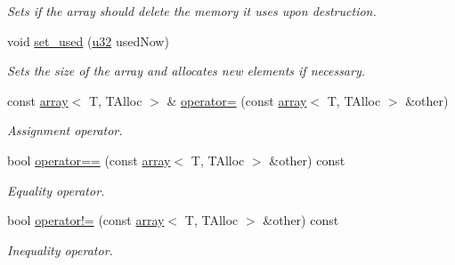 \begin{DoxyCompactItemize}
\begin{DoxyCompactList}\small\item\em Sets if the array should delete the memory it uses upon destruction. \end{DoxyCompactList}\item 
void \hyperlink{classirr_1_1core_1_1array_a64d70ab89f03e2ec4deae3b6c0161305}{set\+\_\+used} (\hyperlink{namespaceirr_a0416a53257075833e7002efd0a18e804}{u32} used\+Now)
\begin{DoxyCompactList}\small\item\em Sets the size of the array and allocates new elements if necessary. \end{DoxyCompactList}\item 
\mbox{\label{classirr_1_1core_1_1array_a51c964d180507ebdef872d93886c23b2}} 
const \hyperlink{classirr_1_1core_1_1array}{array}$<$ T, T\+Alloc $>$ \& \hyperlink{classirr_1_1core_1_1array_a51c964d180507ebdef872d93886c23b2}{operator=} (const \hyperlink{classirr_1_1core_1_1array}{array}$<$ T, T\+Alloc $>$ \&other)
\begin{DoxyCompactList}\small\item\em Assignment operator. \end{DoxyCompactList}\item 
\mbox{\label{classirr_1_1core_1_1array_a794059b2ff063c9604eb46ae4edb599c}} 
bool \hyperlink{classirr_1_1core_1_1array_a794059b2ff063c9604eb46ae4edb599c}{operator==} (const \hyperlink{classirr_1_1core_1_1array}{array}$<$ T, T\+Alloc $>$ \&other) const
\begin{DoxyCompactList}\small\item\em Equality operator. \end{DoxyCompactList}\item 
\mbox{\label{classirr_1_1core_1_1array_a7177f0d74f839a3f26df8eedcdfc4391}} 
bool \hyperlink{classirr_1_1core_1_1array_a7177f0d74f839a3f26df8eedcdfc4391}{operator!=} (const \hyperlink{classirr_1_1core_1_1array}{array}$<$ T, T\+Alloc $>$ \&other) const
\begin{DoxyCompactList}\small\item\em Inequality operator. \end{DoxyCompactList}\item 
\mbox{\label{classirr_1_1core_1_1array_a1e09dc5cc93e88fd3a37cad011b3b531}} 

\end{DoxyCompactItemize}
